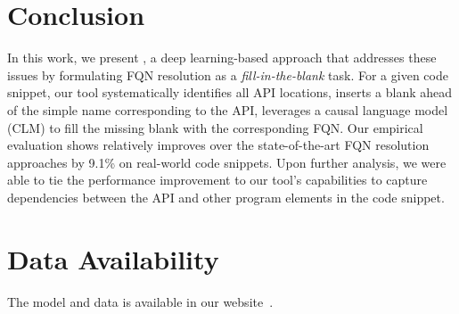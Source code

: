 \section{Conclusion}
\label{sec:conclusion}

In this work, we present {\tool}, a deep learning-based approach that
addresses these issues by formulating FQN resolution as a
\textit{fill-in-the-blank} task. For a given code snippet, our tool
systematically identifies all API locations, inserts a blank ahead of
the simple name corresponding to the API, leverages a causal language
model (CLM) to fill the missing blank with the corresponding FQN.  Our
empirical evaluation shows relatively improves over the
state-of-the-art FQN resolution approaches by 9.1\% on real-world code
snippets. Upon further analysis, we were able to tie the performance
improvement to our tool's capabilities to capture dependencies between
the API and other program elements in the code snippet.


\section{Data Availability}

The model and data is available in our website~\cite{deepfqn}.
